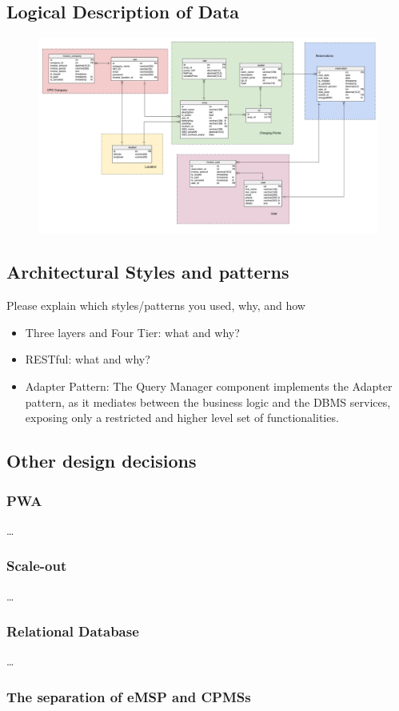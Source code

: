 \subsection{Logical Description of Data}
\begin{figure}[H]
    \includegraphics[scale=0.30]{src/ERDiagram/er_diagram.pdf}
\end{figure}

\subsection{Architectural Styles and patterns}
Please explain which styles/patterns you used, why, and how

\begin{itemize}
    \item Three layers and Four Tier: what and why?
    \item RESTful: what and why?
    \item Adapter Pattern: The Query Manager component implements the Adapter pattern, as it mediates between the
          business logic and the DBMS services, exposing only a restricted and higher level set of functionalities.
\end{itemize}
\subsection{Other design decisions}
\subsubsection{PWA}
\dots
\subsubsection{Scale-out}
\dots
\subsubsection{Relational Database}
\dots
\subsubsection{The separation of eMSP and CPMSs}